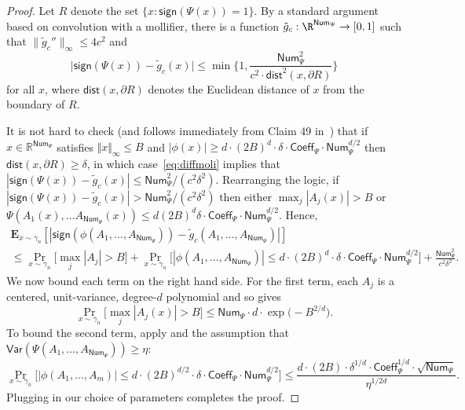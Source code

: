\documentclass{toc}
\newcommand{\Coeff}{\mathsf{Coeff}}
\newcommand{\Num}{\mathsf{Num}}
\begin{document}
\begin{proof}
Let $R$ denote the set $\{x: \mathsf{sign}(\Psi(x)) = 1\}$. By a standard argument based
on convolution with a mollifier, there is a function $\tilde{g}_c :
\R^{\mathsf{Num}_\Psi} \to [0, 1]$ such that $\| \tilde g_c''\|_\infty \le 4
c^2$ and
\begin{equation}\label{eq:diffmoli} 
    \big| \mathsf{sign}(\Psi(x)) - \tilde{g}_c(x) \big| \leq \min \bigg\{ 1,
    \frac{\mathsf{Num}_\Psi^2}{c^2 \cdot \mathsf{dist}^2(x, \partial R)}\bigg\}
\end{equation}
for all $x$, where $\mathsf{dist} (x, \partial R)$  denotes the Euclidean
distance of $x$ from the boundary of $R$.

It is not hard to check (and follows immediately from Claim 49 in~\cite{DS14})
that if $x \in \mathbb{R}^{\Num_\Psi} $ satisfies $\Vert x \Vert_{\infty} \le B$ and
$|\phi(x)| \ge d \cdot (2B)^{d} \cdot \delta \cdot \mathsf{Coeff}_\Psi \cdot \Num_\Psi^{d/2}$
then $\mathsf{dist}(x, \partial R)\ge \delta$, in which case~\eqref{eq:diffmoli} implies
that $|\mathsf{sign}(\Psi(x)) - \tilde g_c(x)| \le \mathsf{Num}_\Psi^2 / (c^2 \delta^2)$.
Rearranging the logic, if $|\mathsf{sign}(\Psi(x)) - \tilde g_c(x)| > \mathsf{Num}_\Psi^2 / (c^2 \delta^2)$ then either $\max_j |A_j(x)| > B$ or $\Psi(A_1(x), \dots A_{\mathsf{Num}_\Psi}(x)) \le d (2B)^d \delta \cdot \Coeff_\Psi \cdot \Num_\Psi^{d/2}$. Hence,
\begin{multline*}
    \mathbf{E}_{x \sim \gamma_n} [|\mathsf{sign}(\phi(A_1, \ldots, A_{\Num_\Psi})) -
    \tilde{g}_c(A_1, \ldots, A_{\Num_\Psi})|] \\
    \le
    \Pr_{x \sim \gamma_n} \big[\max_j |A_j| > B\big] + \Pr_{x \sim \gamma_n} \big[ |\phi(A_1, \ldots, A_{\Num_\Psi})| \le d \cdot (2B)^{d} \cdot \delta \cdot \Coeff_\Psi \cdot \Num_\Psi^{d/2}\big] + \frac{\Num_\Psi^2}{c^2 \delta^2}. 
\end{multline*}
We now bound each term on the right hand side. For the first term, each $A_j$
is a centered, unit-variance, degree-$d$ polynomial and so
 gives
$$
\Pr_{x \sim \gamma_n} \big[\max_j |A_j(x)| > B\big]  \le \Num_\Psi \cdot d \cdot \exp \big( -B^{2/d}\big).
$$
To bound the second term, apply  and the assumption
that $\mathsf{Var}(\Psi(A_1, \ldots, A_{\Num_\Psi})) \ge \eta$:
\[
\Pr_{x \sim \gamma_n} \big[
    |\phi(A_1, \ldots, A_m)| \le d \cdot (2B)^{d/2} \cdot \delta \cdot \Coeff_\Psi \cdot \Num_\Psi^{d/2}\big] \le \frac{d \cdot (2B) \cdot \delta^{1/d} \cdot \Coeff_\Psi^{1/d} \cdot \sqrt{\Num_\Psi}}{\eta^{1/2d}}.
\]
Plugging in our choice of parameters completes the proof.
\end{proof}
\end{document}
